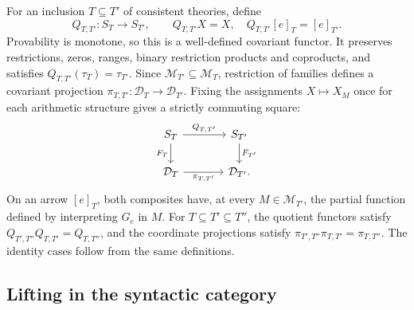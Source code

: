\documentclass[11pt]{article}
\begin{document}
For an inclusion $T\subseteq T'$ of consistent theories, define
\[
 Q_{T,T'}:S_T\to S_{T'},\qquad
 Q_{T,T'}X=X,\quad Q_{T,T'}[e]_T=[e]_{T'}.
\]
Provability is monotone, so this is a well-defined covariant functor.
It preserves restrictions, zeros, ranges, binary restriction products
and coproducts, and satisfies $Q_{T,T'}(\tau_T)=\tau_{T'}$.
Since $\mathcal M_{T'}\subseteq\mathcal M_T$, restriction of families
defines a covariant projection
$\pi_{T,T'}:\mathcal D_T\to\mathcal D_{T'}$. Fixing the assignments
$X\mapsto X_M$ once for each arithmetic structure gives a strictly
commuting square:
\[
\begin{tikzcd}[column sep=large]
 S_T \arrow[r,"Q_{T,T'}"] \arrow[d,"F_T"'] &
 S_{T'} \arrow[d,"F_{T'}"]\\
 \mathcal D_T \arrow[r,"\pi_{T,T'}"'] & \mathcal D_{T'}.
\end{tikzcd}
\]
On an arrow $[e]_T$, both composites have, at every
$M\in\mathcal M_{T'}$, the partial function defined by interpreting
$G_e$ in $M$. For $T\subseteq T'\subseteq T''$, the quotient
functors satisfy $Q_{T',T''}Q_{T,T'}=Q_{T,T''}$, and the coordinate
projections satisfy
$\pi_{T',T''}\pi_{T,T'}=\pi_{T,T''}$.
The identity cases follow from the same definitions.

\subsection{Lifting in the syntactic category}
\end{document}
